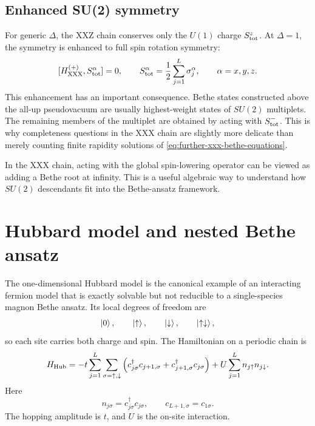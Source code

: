 \subsection{Enhanced SU(2) symmetry}
\label{subsec:further-xxx-su2}

For generic $\Delta$, the XXZ chain conserves only the $U(1)$ charge
$S^z_{\rm tot}$.  At $\Delta=1$, the symmetry is enhanced to full spin
rotation symmetry:
\begin{equation}
\label{eq:further-xxx-su2-commutator}
    [H_{\rm XXX}^{(+)},S^\alpha_{\rm tot}]=0,
    \qquad
    S^\alpha_{\rm tot}=\frac12\sum_{j=1}^{L}\sigma_j^\alpha,
    \qquad
    \alpha=x,y,z .
\end{equation}
This enhancement has an important consequence.  Bethe states constructed above
the all-up pseudovacuum are usually highest-weight states of $SU(2)$ multiplets.
The remaining members of the multiplet are obtained by acting with
$S^-_{\rm tot}$.  This is why completeness questions in the XXX chain are
slightly more delicate than merely counting finite rapidity solutions of
\cref{eq:further-xxx-bethe-equations}.

\begin{remark}
In the XXX chain, acting with the global spin-lowering operator can be viewed as
adding a Bethe root at infinity.  This is a useful algebraic way to understand
how $SU(2)$ descendants fit into the Bethe-ansatz framework.
\end{remark}

\section{Hubbard model and nested Bethe ansatz}
\label{sec:further-hubbard-model}

The one-dimensional Hubbard model is the canonical example of an interacting
fermion model that is exactly solvable but not reducible to a single-species
magnon Bethe ansatz.  Its local degrees of freedom are
\begin{equation}
\label{eq:further-hubbard-local-space}
    \left|0\right\rangle,
    \qquad
    \left|\uparrow\right\rangle,
    \qquad
    \left|\downarrow\right\rangle,
    \qquad
    \left|\uparrow\downarrow\right\rangle,
\end{equation}
so each site carries both charge and spin.  The Hamiltonian on a periodic chain
is
\begin{equation}
\label{eq:further-hubbard-hamiltonian}
    H_{\rm Hub}
    =
    -t\sum_{j=1}^{L}\sum_{\sigma=\uparrow,\downarrow}
    \left(
        c_{j\sigma}^\dagger c_{j+1,\sigma}
        +c_{j+1,\sigma}^\dagger c_{j\sigma}
    \right)
    +U\sum_{j=1}^{L}n_{j\uparrow}n_{j\downarrow} .
\end{equation}
Here
\begin{equation}
    n_{j\sigma}=c_{j\sigma}^\dagger c_{j\sigma},
    \qquad
    c_{L+1,\sigma}=c_{1\sigma}.
\end{equation}
The hopping amplitude is $t$, and $U$ is the on-site interaction.

